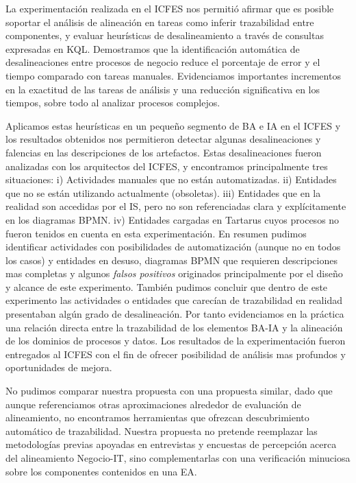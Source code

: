 La experimentaci\'on realizada en el ICFES nos permiti\'o afirmar que es posible soportar el an\'alisis de alineaci\'on en tareas como inferir trazabilidad entre componentes, y evaluar heur\'isticas de desalineamiento a trav\'es de consultas expresadas en KQL. Demostramos que la identificaci\'on autom\'atica de desalineaciones entre procesos de negocio reduce el porcentaje de error y el tiempo comparado con tareas manuales. Evidenciamos importantes incrementos en la exactitud de las tareas de an\'alisis y una reducci\'on significativa en los tiempos, sobre todo al analizar procesos complejos.

Aplicamos estas heur\'isticas en un peque\~no segmento de BA e IA en el ICFES y los resultados obtenidos nos permitieron detectar algunas desalineaciones y falencias en las descripciones de los artefactos. Estas desalineaciones fueron analizadas con los arquitectos del ICFES, y encontramos principalmente tres situaciones: i) Actividades manuales que no est\'an automatizadas. ii) Entidades que no se est\'an utilizando actualmente (obsoletas). iii) Entidades que en la realidad son accedidas por el IS, pero no son referenciadas clara y expl\'icitamente en los diagramas BPMN. iv) Entidades cargadas en Tartarus cuyos procesos no fueron tenidos en cuenta en esta experimentaci\'on. En resumen pudimos identificar actividades con posibilidades de automatizaci\'on (aunque no en todos los casos) y entidades en desuso, diagramas BPMN que requieren descripciones mas completas y algunos \textit{falsos positivos} originados principalmente por el dise\~no y alcance de este experimento. Tambi\'en pudimos concluir que dentro de este experimento las actividades o entidades que carec\'ian de trazabilidad en realidad presentaban alg\'un grado de desalineaci\'on. Por tanto evidenciamos en la pr\'actica una relaci\'on directa entre la trazabilidad de los elementos BA-IA y la alineaci\'on de los dominios de procesos y datos. Los resultados de la experimentaci\'on fueron entregados al ICFES con el fin de ofrecer posibilidad de an\'alisis mas profundos y oportunidades de mejora.

No pudimos comparar nuestra propuesta con una propuesta similar, dado que aunque referenciamos otras aproximaciones alrededor de evaluaci\'on de alineamiento, no encontramos herramientas que ofrezcan descubrimiento autom\'atico de trazabilidad. Nuestra propuesta no pretende reemplazar las metodolog\'ias previas apoyadas en entrevistas y encuestas de percepci\'on acerca del alineamiento Negocio-IT, sino complementarlas con una verificaci\'on minuciosa sobre los componentes contenidos en una EA.

